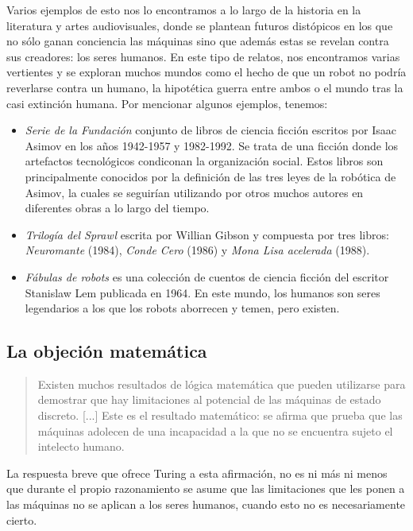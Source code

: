 \documentclass[12pt,a4paper]{article}
\begin{document}
Varios ejemplos de esto nos lo encontramos a lo largo de la historia en la literatura y artes audiovisuales, donde se plantean futuros distópicos en los que no sólo ganan conciencia las máquinas sino que además estas se revelan contra sus creadores: los seres humanos. En este tipo de relatos, nos encontramos varias vertientes y se exploran muchos mundos como el hecho de que un robot no podría reverlarse contra un humano, la hipotética guerra entre ambos o el mundo tras la casi extinción humana. Por mencionar algunos ejemplos, tenemos:

\begin{itemize}
\item \emph{Serie de la Fundación} conjunto de libros de ciencia ficción escritos por Isaac Asimov en los años 1942-1957 y 1982-1992. Se trata de una ficción donde los artefactos tecnológicos condiconan la organización social. Estos libros son principalmente conocidos por la definición de las tres leyes de la robótica de Asimov, la cuales se seguirían utilizando por otros muchos autores en diferentes obras a lo largo del tiempo.
\item \emph{Trilogía del Sprawl} escrita por Willian Gibson y compuesta por tres libros: \emph{Neuromante} (1984),\emph{ Conde Cero} (1986) y \emph{Mona Lisa acelerada} (1988).
\item \emph{Fábulas de robots} es una colección de cuentos de ciencia ficción del escritor Stanislaw Lem publicada en 1964. En este mundo, los humanos son seres legendarios a los que los robots aborrecen y temen, pero existen.
\end{itemize}

\subsection{La objeción matemática}
\begin{quote}\small Existen muchos resultados de lógica matemática que pueden utilizarse para demostrar que hay limitaciones al potencial de las máquinas de estado discreto. [...] Este es el resultado matemático: se afirma que prueba que las máquinas adolecen de una incapacidad a la que no se encuentra sujeto el intelecto humano.\end{quote}

La respuesta breve que ofrece Turing a esta afirmación, no es ni más ni menos que durante el propio razonamiento se asume que las limitaciones que les ponen a las máquinas no se aplican a los seres humanos, cuando esto no es necesariamente cierto.
\end{document}
